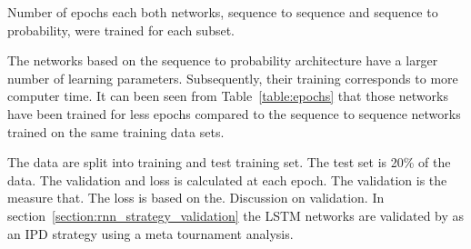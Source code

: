 \begin{table}[!htbp]
    \begin{center}
    \resizebox{.9\textwidth}{!}{
        
    }
\end{center}
\caption{Number of epochs each both networks, sequence to sequence and 
sequence to probability, were trained for each subset.}\label{table:epochs}
\end{table}

The networks based on the sequence to probability architecture have a larger
number of learning parameters. Subsequently, their training corresponds to more
computer time. It can been seen from Table~\ref{table:epochs} that those
networks have been trained for less epochs compared to the sequence to sequence
networks trained on the same training data sets.

The data are split into training and test training set. The test set is
20\% of the data. The validation and loss is calculated at each epoch.
The validation is the measure that. The loss is based on the.
Discussion on validation. In section~\ref{section:rnn_strategy_validation} the
LSTM networks are validated by as an IPD strategy using a meta tournament
analysis. %

